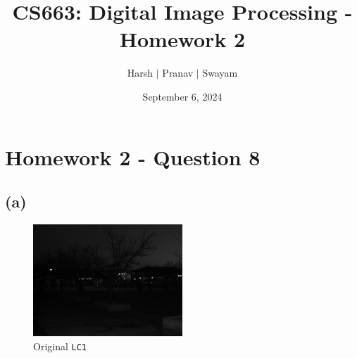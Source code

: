 \documentclass{article}
\title{CS663: Digital Image Processing - Homework 2}
\author{Harsh $\vert$ Pranav $\vert$ Swayam}
\date{September 6, 2024}
\begin{document}
\maketitle
\section{Homework 2 - Question 8}

\subsection*{(a)}

\begin{figure}[!htb]
    \centering
    \includegraphics[width = 0.5\textwidth]{LC1.png}
    \caption{Original \texttt{LC1}}
\end{figure}
\end{document}
